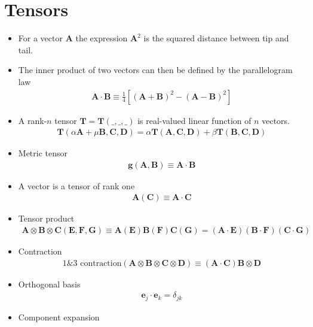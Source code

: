 \documentclass[../main.tex]{subfiles}
\begin{document}
\section{Tensors}
\begin{itemize}
\item For a vector $\mathbf{A}$ the expression $\mathbf{A}^2$ is the squared distance between tip and tail.
\item The inner product of two vectors can then be defined by the parallelogram law
\begin{align}
    \mathbf{A}\cdot\mathbf{B}\equiv\frac{1}{4}\left[(\mathbf{A}+\mathbf{B})^2-(\mathbf{A}-\mathbf{B})^2\right]
\end{align}
\item A rank-$n$ tensor $\mathbf{T}=\mathbf{T}(\_,\_,\_)$ is real-valued linear function of $n$ vectors.
\begin{align}
    \mathbf{T}(\alpha\mathbf{A}+\mu\mathbf{B},\mathbf{C},\mathbf{D})=\alpha\mathbf{T}(\mathbf{A},\mathbf{C},\mathbf{D})+\beta\mathbf{T}(\mathbf{B},\mathbf{C},\mathbf{D})
\end{align}
\item Metric tensor
\begin{align}
    \mathbf{g}(\mathbf{A},\mathbf{B})\equiv\mathbf{A}\cdot\mathbf{B}
\end{align}
\item A vector is a tensor of rank one 
\begin{align}
    \mathbf{A}(\mathbf{C})\equiv\mathbf{A}\cdot\mathbf{C}
\end{align}
\item Tensor product 
\begin{align}
    \mathbf{A}\otimes\mathbf{B}\otimes\mathbf{C}(\mathbf{E},\mathbf{F},\mathbf{G})\equiv\mathbf{A}(\mathbf{E})\mathbf{B}(\mathbf{F})\mathbf{C}(\mathbf{G})=(\mathbf{A}\cdot\mathbf{E})(\mathbf{B}\cdot\mathbf{F})(\mathbf{C}\cdot\mathbf{G})
\end{align}
\item Contraction
\begin{align}
    \text{1\&3 contraction}(\mathbf{A}\otimes\mathbf{B}\otimes\mathbf{C}\otimes\mathbf{D})\equiv(\mathbf{A}\cdot\mathbf{C})\mathbf{B}\otimes\mathbf{D}
\end{align}
\item Orthogonal basis
\begin{align}
    \mathbf{e}_j\cdot\mathbf{e}_k=\delta_{jk}
\end{align}
\item Component expansion

\end{itemize}
\end{document}
